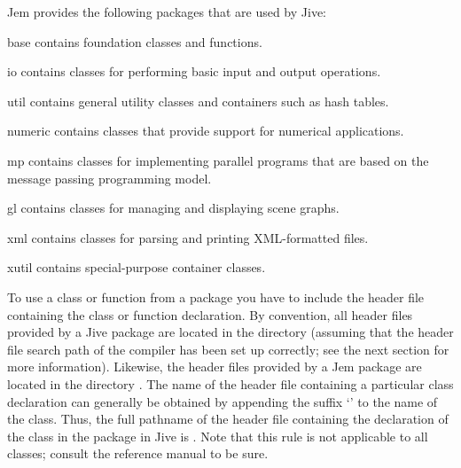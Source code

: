Jem provides the following packages that are used by Jive:
\begin{Description}[\Code]

\item[base]    contains foundation classes and functions.

\item[io]      contains classes for performing basic input and output
  operations.

\item[util]    contains general utility classes and containers such as
  hash tables.

\item[numeric] contains classes that provide support for numerical
  applications.

\item[mp]      contains classes for implementing parallel programs that
  are based on the message passing programming model.

\item[gl]      contains classes for managing and displaying scene
  graphs.

\item[xml]     contains classes for parsing and printing XML-formatted
  files.

\item[xutil]   contains special-purpose container classes.

\end{Description}

To use a class or function from a package you have to include the header
file containing the class or function declaration. By convention, all
header files provided by a Jive package are located in the directory
 (assuming that the header file search
path of the compiler has been set up correctly; see the next section for
more information). Likewise, the header files provided by a Jem package
are located in the directory . The name
of the header file containing a particular class declaration can
generally be obtained by appending the suffix `' to the name of
the class. Thus, the full pathname of the header file containing the
declaration of the class  in the package  in
Jive is . Note that this rule is not
applicable to all classes; consult the reference manual to be sure.


